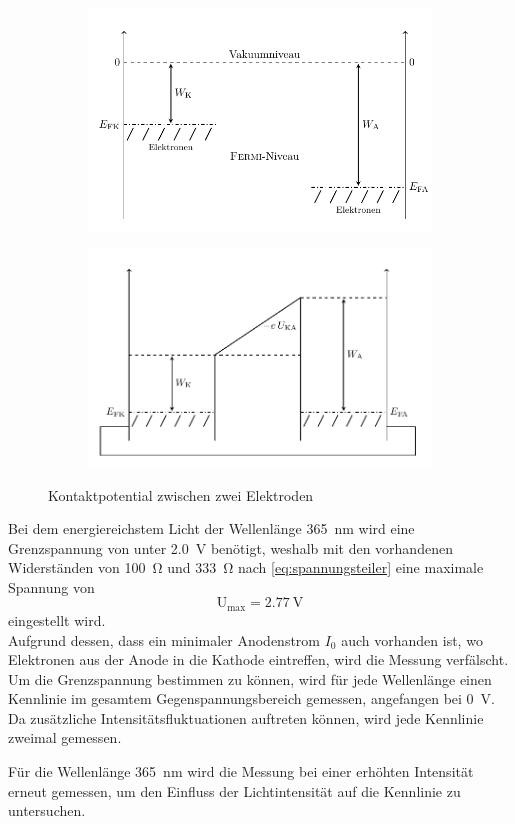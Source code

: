 \begin{figure}[htb]
	\centering
	\begin{subfigure}[c]{0.46\linewidth}
		\includegraphics[width=\linewidth]{../figs/fermi1.png}
	\end{subfigure}
	\begin{subfigure}[c]{0.46\linewidth}
		\includegraphics[width=\linewidth]{../figs/fermi2.png}
	\end{subfigure}
	\caption{Kontaktpotential zwischen zwei Elektroden}
\end{figure}

Bei dem energiereichstem Licht der Wellenlänge \SI{365}{\nano\meter} wird eine Grenzspannung von unter
\SI{2.0}{\volt} benötigt, weshalb mit den vorhandenen Widerständen von \SI{100}{\ohm} und \SI{333}{\ohm}
nach \cref{eq:spannungsteiler} eine maximale Spannung von
\[\mathrm U_\mathrm{max} = \SI{2.77}{\volt}\]
eingestellt wird.\\
Aufgrund dessen, dass ein minimaler Anodenstrom $I_0$ auch vorhanden ist, wo Elektronen aus der
Anode in die Kathode eintreffen, wird die Messung verfälscht. Um die Grenzspannung bestimmen zu können,
wird für jede Wellenlänge einen Kennlinie im gesamtem Gegenspannungsbereich gemessen, angefangen
bei \SI{0}{\volt}. Da zusätzliche Intensitätsfluktuationen auftreten können, wird jede Kennlinie
zweimal gemessen.\\\par
Für die Wellenlänge \SI{365}{\nano\meter} wird die Messung bei einer erhöhten Intensität
erneut gemessen, um den Einfluss der Lichtintensität auf die Kennlinie zu untersuchen.

